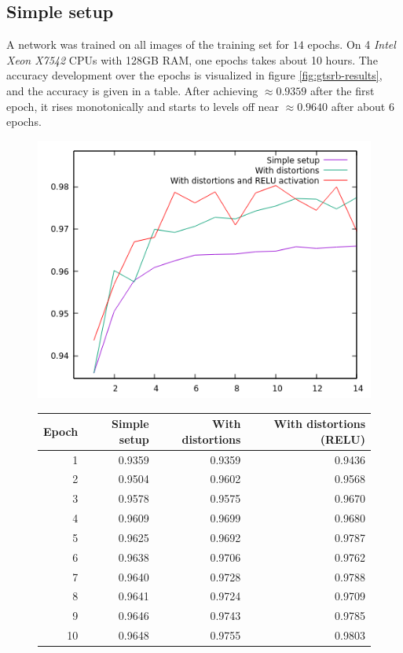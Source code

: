 \documentclass[11pt, a4paper]{article}
\begin{document}
\subsection{Simple setup}
\label{subsec:simplesetup}
A network was trained on all images of the training set for $14$ epochs. On 4 \emph{Intel Xeon X7542} CPUs with 128GB RAM, one epochs takes about 10 hours. The accuracy development over the epochs is visualized in figure \ref{fig:gtsrb-results}, and the accuracy is given in a table. After achieving $\approx 0.9359$ after the first epoch, it rises monotonically and starts to levels off near $\approx 0.9640$ after about 6 epochs.

\begin{figure}[h!]
	\centering
	\includegraphics{gtsrb_results}
	\begin{tabular}{|r|rrr|}
		\hline
		Epoch & Simple setup & With distortions & With distortions (RELU) \\
		\hline
		1 & 0.9359 & 0.9359 & 0.9436 \\
		2 & 0.9504 & 0.9602 & 0.9568 \\
		3 & 0.9578 & 0.9575 & 0.9670 \\
		4 & 0.9609 & 0.9699 & 0.9680 \\
		5 & 0.9625 & 0.9692 & 0.9787 \\
		6 & 0.9638 & 0.9706 & 0.9762 \\
		7 & 0.9640 & 0.9728 & 0.9788 \\
		8 & 0.9641 & 0.9724 & 0.9709 \\
		9 & 0.9646 & 0.9743 & 0.9785 \\
		10 & 0.9648 & 0.9755 & 0.9803 \\

\end{tabular}
\end{figure}
\end{document}
